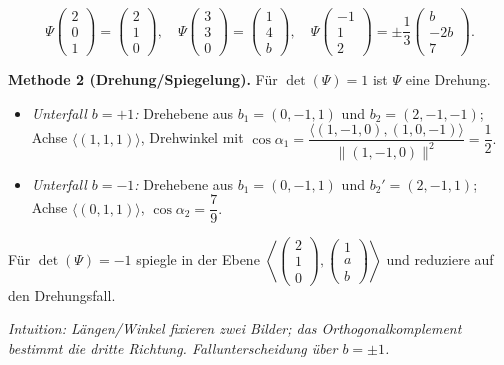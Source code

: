 \documentclass[11pt, a4paper]{article}
\begin{document}
\[
\Psi\!\begin{pmatrix}2\\0\\1\end{pmatrix}=\begin{pmatrix}2\\1\\0\end{pmatrix},\quad
\Psi\!\begin{pmatrix}3\\3\\0\end{pmatrix}=\begin{pmatrix}1\\4\\b\end{pmatrix},\quad
\Psi\!\begin{pmatrix}-1\\1\\2\end{pmatrix}= \pm \frac{1}{3}\begin{pmatrix}b\\-2b\\7\end{pmatrix}.
\]

\smallskip
\textbf{Methode 2 (Drehung/Spiegelung).}
Für $\det(\Psi)=1$ ist $\Psi$ eine Drehung. 
\begin{itemize}
\item \emph{Unterfall $b=+1$:} Drehebene aus
$b_1=(0,-1,1)$ und $b_2=(2,-1,-1)$; Achse $\langle(1,1,1)\rangle$,
Drehwinkel mit
\(
\cos\alpha_1=\dfrac{\langle (1,-1,0),(1,0,-1)\rangle}{\|(1,-1,0)\|^2}=\dfrac12.
\)
\item \emph{Unterfall $b=-1$:} Drehebene aus
$b_1=(0,-1,1)$ und $b_2'=(2,-1,1)$; Achse $\langle(0,1,1)\rangle$,
\(
\cos\alpha_2=\dfrac{7}{9}.
\)
\end{itemize}
Für $\det(\Psi)=-1$ spiegle in der Ebene
$\left\langle\begin{pmatrix}2\\1\\0\end{pmatrix},\begin{pmatrix}1\\a\\b\end{pmatrix}\right\rangle$
und reduziere auf den Drehungsfall.

\medskip\noindent\textit{Intuition: Längen/Winkel fixieren zwei Bilder; das Orthogonalkomplement bestimmt die dritte Richtung. Fallunterscheidung über $b=\pm1$.}
\end{document}
